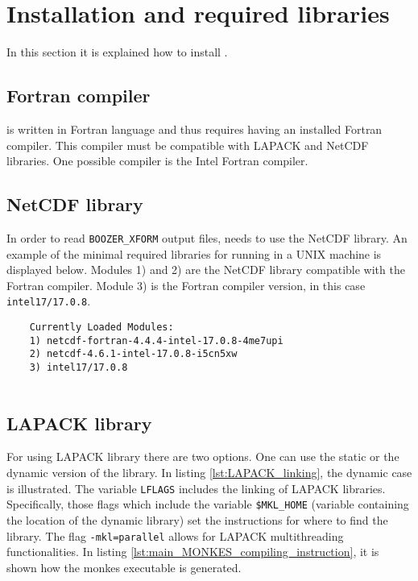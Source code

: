 \section{Installation and required libraries}
In this section it is explained how to install {\MONKES}. 
\subsection{Fortran compiler}
{\MONKES} is written in Fortran language and thus requires having an installed Fortran compiler. This compiler must be compatible with LAPACK and NetCDF libraries. One possible compiler is the Intel Fortran compiler.

\subsection{NetCDF library}

In order to read \texttt{BOOZER\_XFORM} output files, {\MONKES} needs to use the NetCDF library. An example of the minimal required libraries for running {\MONKES} in a UNIX machine is displayed below. Modules 1) and 2) are the NetCDF library compatible with the Fortran compiler. Module 3) is the Fortran compiler version, in this case \texttt{intel17/17.0.8}.
\begin{verbatim}
	Currently Loaded Modules:
	1) netcdf-fortran-4.4.4-intel-17.0.8-4me7upi   
	2) netcdf-4.6.1-intel-17.0.8-i5cn5xw   
	3) intel17/17.0.8
	
\end{verbatim} 

\subsection{LAPACK library}
For using LAPACK library there are two options. One can use the static or the dynamic version of the library. In listing \ref{lst:LAPACK_linking}, the dynamic case is illustrated.
 The variable \texttt{LFLAGS} includes the linking of LAPACK libraries. Specifically, those flags which include the variable \texttt{\$MKL\_HOME} (variable containing the location of the dynamic library) set the instructions for where to find the library. The flag \texttt{-mkl=parallel} allows for LAPACK multithreading functionalities. In listing \ref{lst:main_MONKES_compiling_instruction}, it is shown how the monkes executable is generated. 
 
 
 